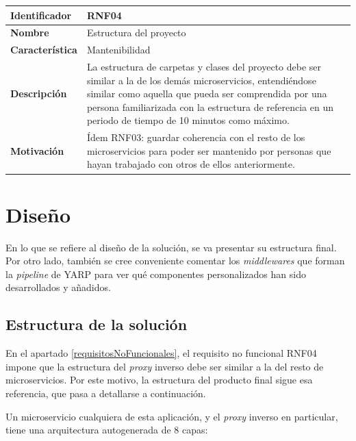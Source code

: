 \documentclass[11pt,spanish,listoffigures]{tfgetsinf}
\begin{document}
\begin{center} \begin{tabular}{| l | p{11.3cm} |}
\hline
\textbf{Identificador} & RNF04
\\ \hline
\textbf{Nombre} & Estructura del proyecto
\\ \hline
\textbf{Característica} & Mantenibilidad
\\ \hline
\textbf{Descripción} & La estructura de carpetas y clases del proyecto debe ser similar a la de los demás microservicios, entendiéndose similar como aquella que pueda ser comprendida por una persona familiarizada con la estructura de referencia en un periodo de tiempo de 10 minutos como máximo.
\\ \hline
\textbf{Motivación} & Ídem RNF03: guardar coherencia con el resto de los microservicios para poder ser mantenido por personas que hayan trabajado con otros de ellos anteriormente.
\\ \hline \end{tabular} \end{center}


	\section{Diseño}

En lo que se refiere al diseño de la solución, se va presentar su estructura final. Por otro lado, también se cree conveniente comentar los \emph{middlewares} que forman la \emph{pipeline} de YARP para ver qué componentes personalizados han sido desarrollados y añadidos.


		\subsection{Estructura de la solución}

En el apartado \ref{requisitosNoFuncionales}, el requisito no funcional RNF04 impone que la estructura del \emph{proxy} inverso debe ser similar a la del resto de microservicios. Por este motivo, la estructura del producto final sigue esa referencia, que pasa a detallarse a continuación.

Un microservicio cualquiera de esta aplicación, y el \emph{proxy} inverso en particular, tiene una arquitectura autogenerada de 8 capas:
\end{document}
